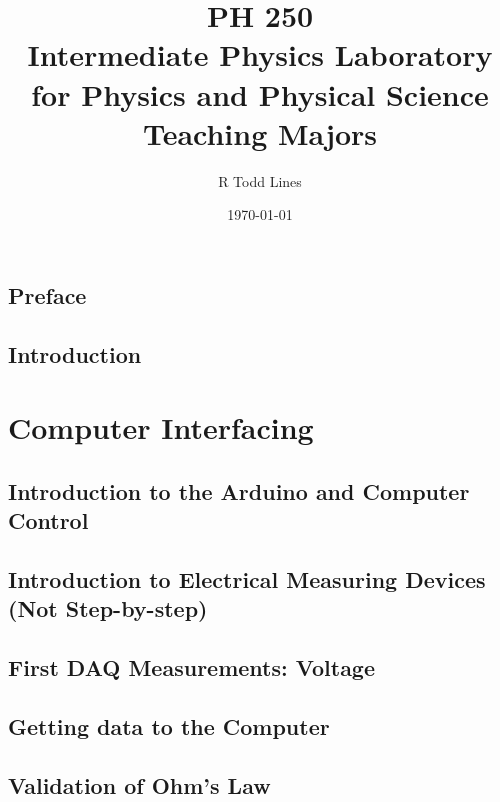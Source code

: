 \documentclass{book}
\begin{document}
\frontmatter
\title{{\Huge PH 250}\\
{\Huge {\Large Intermediate Physics Laboratory for Physics and Physical
Science Teaching Majors} }}
\author{R Todd Lines}
\date{\today}
\maketitle
\tableofcontents

\chapter*{Preface}
	


\chapter{Introduction}


\mainmatter

\part{Computer Interfacing}

	\chapter{Introduction to the Arduino and Computer Control}
		
	
	\chapter{Introduction to Electrical Measuring Devices (Not Step-by-step)}
		
	
	\chapter{First DAQ Measurements: Voltage}
		
	
	\chapter{Getting data to the Computer}
		
	
	\chapter{Validation of Ohm's Law}
		
\end{document}
